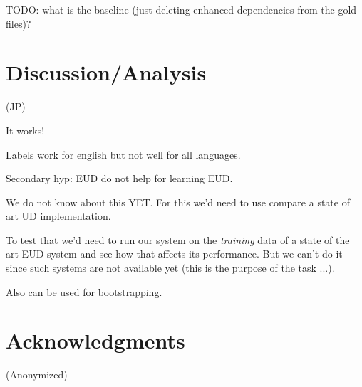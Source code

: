 \documentclass[11pt,a4paper]{article}
\begin{document}
TODO: what is the baseline (just deleting enhanced dependencies from the gold files)?

\section{Discussion/Analysis}
(JP)

It works!

Labels work for english but not well for all languages.

Secondary hyp: EUD do not help for learning EUD.

We do not know about this YET. For this we'd need to use compare a
state of art UD implementation.


To test that we'd need to run our system on the \emph{training} data
of a state of the art EUD system and see how that affects its
performance. But we can't do it since such systems are not available
yet (this is the purpose of the task ...).

Also can be used for bootstrapping.

\section*{Acknowledgments}

(Anonymized)



\end{document}
